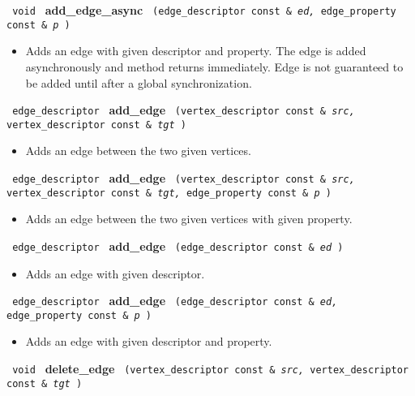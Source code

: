 \noindent
\texttt{%
void
}
\newline
\textbf{add\_edge\_async}%
\texttt{%
(edge\_descriptor const \&
\textit{ed,}%
edge\_property const \&
\textit{p}%
)
}

\begin{itemize}
\item
Adds an edge with given descriptor and property. The edge is added asynchronously and method returns immediately. Edge is not guaranteed to be added until after a global synchronization.
\end{itemize}

\noindent
\texttt{%
edge\_descriptor
}
\newline
\textbf{add\_edge}%
\texttt{%
(vertex\_descriptor const \&
\textit{src,}%
vertex\_descriptor const \&
\textit{tgt}%
)
}

\begin{itemize}
\item
Adds an edge between the two given vertices.
\end{itemize}

\noindent
\texttt{%
edge\_descriptor
}
\newline
\textbf{add\_edge}%
\texttt{%
(vertex\_descriptor const \&
\textit{src,}%
vertex\_descriptor const \&
\textit{tgt,}%
edge\_property const \&
\textit{p}%
)
}

\begin{itemize}
\item
Adds an edge between the two given vertices with given property.
\end{itemize}

\noindent
\texttt{%
edge\_descriptor
}
\newline
\textbf{add\_edge}%
\texttt{%
(edge\_descriptor const \&
\textit{ed}%
)
}

\begin{itemize}
\item
Adds an edge with given descriptor.
\end{itemize}

\noindent
\texttt{%
edge\_descriptor
}
\newline
\textbf{add\_edge}%
\texttt{%
(edge\_descriptor const \&
\textit{ed,}%
edge\_property const \&
\textit{p}%
)
}

\begin{itemize}
\item
Adds an edge with given descriptor and property.
\end{itemize}

\noindent
\texttt{%
void
}
\newline
\textbf{%
 delete\_edge
}
\texttt{%
(vertex\_descriptor const \&
\textit{src,}%
vertex\_descriptor const \&
\textit{tgt}%
)
}

